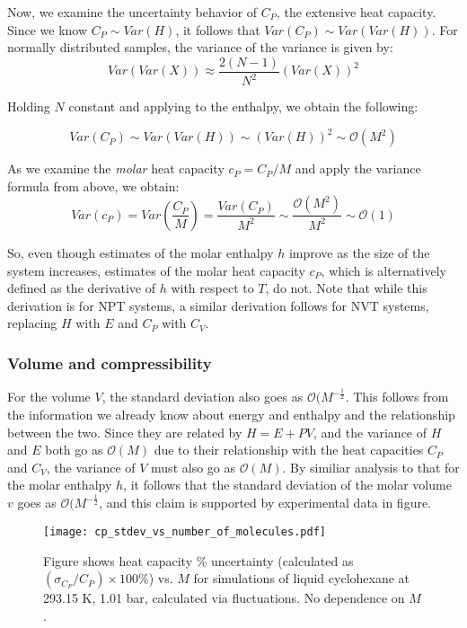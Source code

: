 \documentclass[9pt,bestpractices]{livecoms}
\begin{document}
Now, we examine the uncertainty behavior of $C_P$, the extensive heat capacity.  Since we know $C_P \sim Var(H)$, it follows that $ Var(C_P) \sim Var(Var(H)) $.  For normally distributed samples, the variance of the variance is given by:
\begin{equation}
Var(Var(X)) \approx \frac{2(N-1)}{N^2} (Var(X))^2
\end{equation}

Holding $N$ constant and applying to the enthalpy, we obtain the following:

\begin{equation}
Var(C_P) \sim Var(Var(H)) \sim (Var(H))^2 \sim \mathcal{O}(M^2)
\end{equation}

As we examine the \emph{molar} heat capacity $c_P=C_P/M$ and apply the variance formula from above, we obtain:
\begin{equation}
Var(c_P) = Var(\frac{C_P}{M}) = \frac{Var(C_P)}{M^2}  \sim \frac{\mathcal{O}(M^2)}{M^2} \sim \mathcal{O}(1)
\end{equation}

So, even though estimates of the molar enthalpy $h$ improve as the size of the system increases, estimates of the molar heat capacity $c_P$, which is alternatively defined as the derivative of $h$ with respect to $T$, do not.  Note that while this derivation is for NPT systems, a similar derivation follows for NVT systems, replacing $H$ with $E$ and $C_P$ with $C_V$.

\subsubsection{Volume and compressibility}

For the volume $V$, the standard deviation also goes as $\mathcal{O}(M^{-\frac{1}{2}}$.  This follows from the information we already know about energy and enthalpy and the relationship between the two.  Since they are related by $H=E+PV$, and the variance of $H$ and $E$ both go as $\mathcal{O}(M)$ due to their relationship with the heat capacities $C_P$ and $C_V$, the variance of $V$ must also go as $\mathcal{O}(M)$.  By similiar analysis to that for the molar enthalpy $h$, it follows that the standard deviation of the molar volume $v$ goes as $\mathcal{O}(M^{-\frac{1}{2}}$, and this claim is supported by experimental data in figure. %
\begin{figure}[H]
\texttt{[image: cp\_stdev\_vs\_number\_of\_molecules.pdf]}
\caption{Figure shows heat capacity \% uncertainty (calculated as $(\sigma_{C_P}/C_P) \times 100 \%$) vs. $M$ for simulations of liquid cyclohexane at 293.15 K, 1.01 bar, calculated via fluctuations. No dependence on $M$.}
\end{figure}
\end{document}
